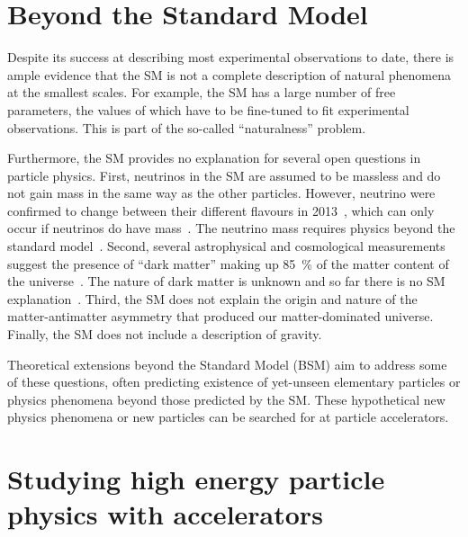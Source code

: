 \section{Beyond the Standard Model}

Despite its success at describing most experimental observations to date, there is ample evidence that the SM is not a complete description of natural phenomena at the smallest scales. For example, the SM has a large number of free parameters, the values of which have to be fine-tuned to fit experimental observations. This is part of the so-called ``naturalness'' problem.

Furthermore, the SM provides no explanation for several open questions in particle physics. First, neutrinos in the SM are assumed to be massless and do not gain mass in the same way as the other particles. However, neutrino were confirmed to change between their different flavours in 2013~\cite{aharmim_combined_2013}, which can only occur if neutrinos do have mass~\cite{pontecorvo_neutrino_1967}. The neutrino mass requires physics beyond the standard model~\cite{bilenky_massive_1987}. Second, several astrophysical and cosmological measurements suggest the presence of ``dark matter'' making up 85~\% of the matter content of the universe~\cite{young_survey_2017}. The nature of dark matter is unknown and so far there is no SM explanation~\cite{munoz_dark_2004}. Third, the SM does not explain the origin and nature of the matter-antimatter asymmetry that produced our matter-dominated universe. Finally, the SM does not include a description of gravity.

Theoretical extensions beyond the Standard Model (BSM) aim to address some of these questions, often predicting existence of yet-unseen elementary particles or physics phenomena beyond those predicted by the SM. These hypothetical new physics phenomena or new particles can be searched for at particle accelerators. 

\section{Studying high energy particle physics with accelerators}

